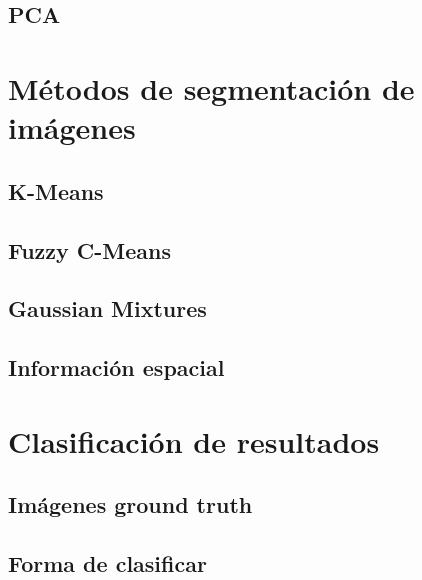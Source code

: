 \subsection{PCA}\label{pca}
\cite{pca2017}

\section{Métodos de segmentación de imágenes}\label{metodos-de-segmentacion-de-imagenes}


\subsection{K-Means}\label{k-means}
\cite{MATLAB:2023bKmeans}

\subsection{Fuzzy C-Means}\label{fuzzy-c-means}
\cite{MATLAB:2023bFuzzy}

\subsection{Gaussian Mixtures}\label{gaussian-mixtures}
\cite{MATLAB:2023bGMM}

\subsection{Información espacial}\label{informacion-espacial}
\cite{wang2012hmrf}

\section{Clasificación de resultados}\label{clasificacion-de-resultados}


\subsection{Imágenes ground truth}\label{imagenes-ground-truth}


\subsection{Forma de clasificar}\label{forma-de-clasificar}

